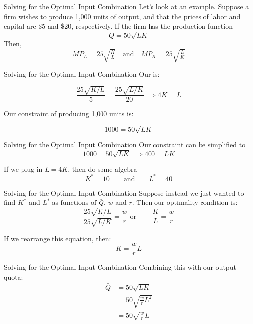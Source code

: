 \documentclass[11pt,t]{beamer}
\begin{document}
\begin{frame}{Solving for the Optimal Input Combination}
  Let's look at an example. Suppose a firm wishes to produce 1,000 units of output, and that the prices of labor and capital are \$5 and \$20, respectively. If the firm has the production function\
  $$
    Q = 50 \sqrt{LK}
  $$
  Then,
  $$
    MP_L = 25\sqrt{\tfrac{K}{L}} \quad\text{and}\quad MP_K = 25\sqrt{\tfrac{L}{K}}
  $$
\end{frame}

\begin{frame}{Solving for the Optimal Input Combination}
  Our  is:
  
  \pause
  $$
    \frac{25\sqrt{K/L}}{5} = \frac{25\sqrt{L/K}}{20} \implies 4K = L
  $$

  \bigskip
  Our constraint of producing 1,000 units is:
  
  \pause
  $$
    1000 = 50 \sqrt{LK}
  $$
\end{frame}

\begin{frame}{Solving for the Optimal Input Combination}
  Our constraint can be simplified to
  $$
    1000 = 50 \sqrt{LK} \implies 400 = LK
  $$

  \pause\bigskip
  If we plug in $L = 4K$, then do some algebra
  \pause
  \begin{equation*}
    K^* = 10 \qquad \text{and} \qquad L^* = 40
  \end{equation*}
\end{frame}


\begin{frame}{Solving for the Optimal Input Combination}
  Suppose instead we just wanted to find  $K^*$ and $L^*$ as functions of $\bar{Q}$, $w$ and $r$. Then our optimality condition is:
  $$
    \frac{25\sqrt{K/L}}{25\sqrt{L/K}}=\frac{w}{r}
    \text{ or } \qquad \frac{K}{L}=\frac{w}{r}
  $$

  \bigskip
  If we rearrange this equation, then:
  $$ 
    K = \frac{w}{r}L
  $$ 
\end{frame}

\begin{frame}{Solving for the Optimal Input Combination}
Combining this with our output quota:
\begin{align*}
  \bar{Q} &= 50\sqrt{LK}             \\
          &= 50\sqrt{\tfrac{w}{r}L^2} \\
          &= 50\sqrt{\tfrac{w}{r}}L
\end{align*}
\end{frame}
\end{document}
